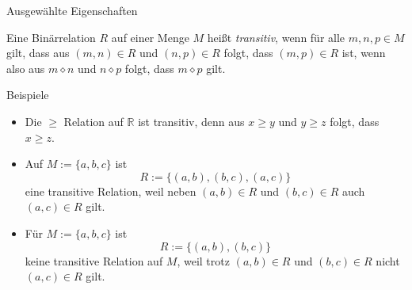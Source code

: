 \documentclass[
  8pt,
  ignorenonframetext,
]{beamer}
\providecommand{\tightlist}{%
  \setlength{\itemsep}{0pt}\setlength{\parskip}{0pt}}
\begin{document}
\begin{frame}{Ausgewählte Eigenschaften}
\protect\hypertarget{ausgewuxe4hlte-eigenschaften-2}{}
\small
\begin{definition}[Transitivität]
\justifying
Eine Binärrelation $R$ auf einer Menge $M$ heißt \textit{transitiv}, wenn für alle
$m,n,p\in M$ gilt, dass aus $(m,n)\in R$ und $(n,p)\in R$ folgt, dass $(m,p) \in R$ ist,
wenn also aus $m \diamond n$ und $n \diamond p$ folgt, dass $m \diamond p$ gilt.
\end{definition}

\footnotesize

Beispiele

\begin{itemize}
\tightlist
\item
  Die \(\ge\) Relation auf \(\mathbb{R}\) ist transitiv, denn aus
  \(x \ge y\) und \(y \ge z\) folgt, dass \(x \ge z\).
\item
  Auf \(M := \{a,b,c\}\) ist \begin{equation}
  R := \{(a,b), (b,c), (a,c)\}
  \end{equation} eine transitive Relation, weil neben \((a,b) \in R\)
  und \((b,c) \in R\) auch \((a,c) \in R\) gilt.
\item
  Für \(M := \{a,b,c\}\) ist \begin{equation}
  R := \{(a,b), (b,c)\}
  \end{equation} keine transitive Relation auf \(M\), weil trotz
  \((a,b) \in R\) und \((b,c) \in R\) nicht \((a,c) \in R\) gilt.
\end{itemize}
\end{frame}
\end{document}
